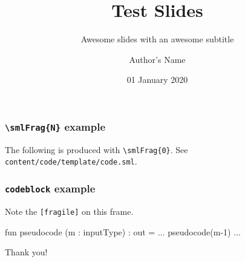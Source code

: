 \documentclass[aspectratio=54]{beamer}
\title{Test Slides} %
\subtitle{Awesome slides with an awesome subtitle} %
\date{01 January 2020} %
\author{Author's Name} %
\newif\ifcolorlambda
\begin{document}
    \ifweb
       \renewcommand{\pause}{}
    \fi


{
\begin{frame}[plain]
    \colorlambdatrue
    \titlepage
\end{frame}
}
{
\begin{frame}[plain]
    \colorlambdafalse
\end{frame}
}

\begin{frame}
    \frametitle{\texttt{\textbackslash smlFrag\{N\}} example}
    The following is produced with \texttt{\textbackslash smlFrag\{0\}}. See \texttt{content/code/template/code.sml}. \pause

\end{frame}

\begin{frame}[fragile]
    \frametitle{\texttt{codeblock} example}
    Note the \texttt{[fragile]} on this frame.\pause

    \begin{codeblock}
       fun pseudocode (m : inputType) : out = 
                 ... 
             pseudocode(m-1) 
                 ... 
    \end{codeblock}
\end{frame}

\begin{frame}
	\begin{center} Thank you! \end{center}
\end{frame}
\end{document}
